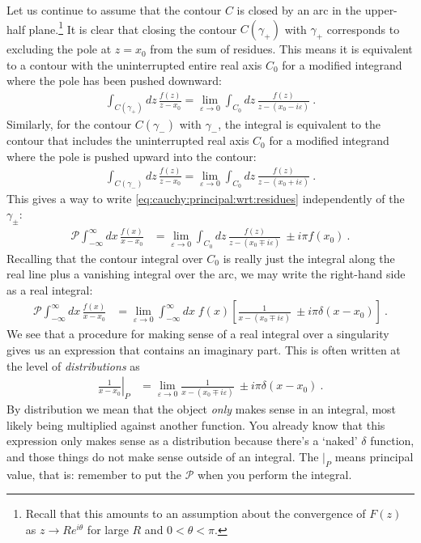 Let us continue to assume that the contour $C$ is closed by an arc in the upper-half plane.\footnote{Recall that this amounts to an assumption about the convergence of $F(z)$ as $z\to Re^{i\theta}$ for large $R$ and $0 < \theta < \pi$.}
It is clear that closing the contour $C(\gamma_+)$ with $\gamma_+$ corresponds to excluding the pole at $z=x_0$ from the sum of residues. This means it is equivalent to a contour with the uninterrupted entire real axis $C_0$ for a modified integrand where the pole has been pushed downward:
\begin{align}
	\int_{C(\gamma_+)} dz \, \frac{f(z)}{z-x_0}
	=
	\lim_{\varepsilon\to 0}
	\int_{C_0} dz \, \frac{f(z)}{z-(x_0-i\varepsilon)} \ .
\end{align}
Similarly, for the contour $C(\gamma_-)$ with $\gamma_-$, the integral is equivalent to the contour that includes the uninterrupted real axis $C_0$ for a modified integrand where the pole is pushed upward into the contour:
\begin{align}
	\int_{C(\gamma_-)} dz \, \frac{f(z)}{z-x_0}
	=
	\lim_{\varepsilon\to 0}
	\int_{C_0} dz \, \frac{f(z)}{z-(x_0+i\varepsilon)} \ .
\end{align}
This gives a way to write \eqref{eq:cauchy:principal:wrt:residues} independently of the $\gamma_\pm$:
\begin{align}
	\mathcal P
	\int_{-\infty}^\infty dx\, \frac{f(x)}{x-x_0}
	&=
	\lim_{\varepsilon\to 0}
	\int_{C_0} dz \, \frac{f(z)}{z-(x_0\mp i\varepsilon)} \ 
	\pm i \pi f(x_0) \ .
\end{align}
Recalling that the contour integral over $C_0$ is really just the integral along the real line plus a vanishing integral over the arc, we may write the right-hand side as a real integral:
\begin{align}
	\mathcal P
	\int_{-\infty}^\infty dx\, \frac{f(x)}{x-x_0}
	&=
	\lim_{\varepsilon\to 0}
	\int_{-\infty}^\infty dx\; f(x)\left[
		\frac{1}{x-(x_0\mp i\varepsilon)} \ 
		\pm i \pi   \delta(x-x_0) 
	\right] 
	 \ .
\end{align}
We see that a procedure for making sense of a real integral over a singularity gives us an expression that contains an imaginary part. This is often written at the level of \emph{distributions} as
\begin{align}
	\left.\frac{1}{x-x_0}\right|_P
	&= 
	\lim_{\varepsilon\to 0}
		\frac{1}{x-(x_0\mp i\varepsilon)} \ 
		\pm i \pi   \delta(x-x_0) \ .
		\label{eq:cauchy:principal:as:distribution}
\end{align}
By distribution we mean that the object \emph{only} makes sense in an integral, most likely being multiplied against another function. You already know that this expression only makes sense as a distribution because there's a `naked' $\delta$ function, and those things do not make sense outside of an integral. The $\left.\right|_P$ means principal value, that is: remember to put the $\mathcal P$ when you perform the integral. 

